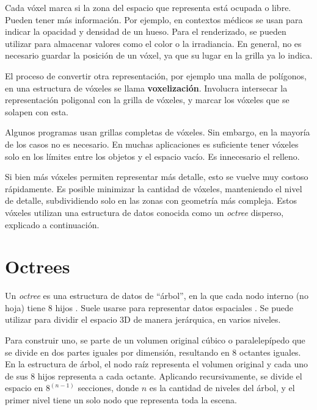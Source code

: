 

Cada vóxel marca si la zona del espacio que representa está ocupada o libre.
Pueden tener más información.
Por ejemplo, en contextos médicos se usan para indicar la opacidad y densidad de un hueso.
Para el renderizado, se pueden utilizar para almacenar valores como el color o la irradiancia.
En general, no es necesario guardar la posición de un vóxel, ya que su lugar en la grilla ya lo indica.

El proceso de convertir otra representación, por ejemplo una malla de polígonos, en una estructura de vóxeles se llama \textbf{voxelización}.
Involucra intersecar la representación poligonal con la grilla de vóxeles, y marcar los vóxeles que se solapen con esta.

Algunos programas usan grillas completas de vóxeles.
Sin embargo, en la mayoría de los casos no es necesario.
En muchas aplicaciones es suficiente tener vóxeles solo en los límites entre los objetos y el espacio vacío.
Es innecesario el relleno.

Si bien más vóxeles permiten representar más detalle, esto se vuelve muy costoso rápidamente.
Es posible minimizar la cantidad de vóxeles, manteniendo el nivel de detalle, subdividiendo solo en las zonas con geometría más compleja.
Estos vóxeles utilizan una estructura de datos conocida como un \textit{octree} disperso, explicado a continuación.

\section{Octrees}\label{sec:octree}

Un \textit{octree} es una estructura de datos de ``árbol'', en la que cada nodo interno (no hoja) tiene $8$ hijos \cite{rtr}.
Suele usarse para representar datos espaciales \cite{octree-textures}.
Se puede utilizar para dividir el espacio 3D de manera jerárquica, en varios niveles.

Para construir uno, se parte de un volumen original cúbico o paralelepípedo que se divide en dos partes iguales por dimensión, resultando en $8$ octantes iguales.
En la estructura de árbol, el nodo raíz representa el volumen original y cada uno de sus $8$ hijos representa a cada octante.
Aplicando recursivamente, se divide el espacio en $8^{(n - 1)}$ secciones, donde $n$ es la cantidad de niveles del árbol, y el primer nivel tiene un solo nodo que representa toda la escena.

